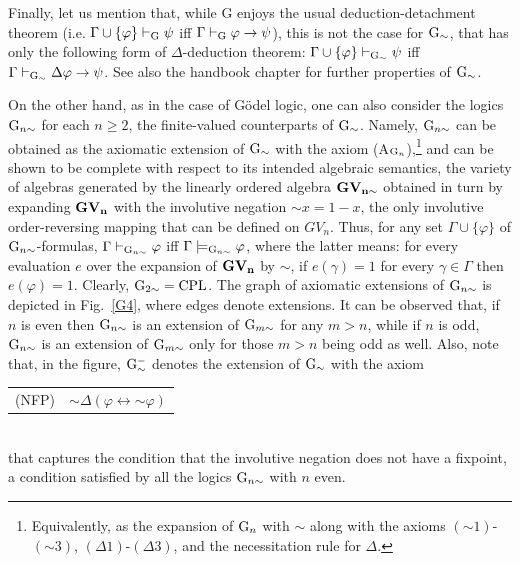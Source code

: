 \documentclass{article}
\theoremstyle{definition}
\newcommand{\ninv}{\mathord{\sim}}
\begin{document}
Finally,  let us mention that, while G enjoys the usual deduction-detachment theorem (i.e. $\Gamma \cup\{\varphi\} \vdash_{{\rm G}} \psi$ iff $\Gamma \vdash_{{\rm G}} \varphi \to \psi$),
this is not the case for ${\rm G}_{\ninv}$, that has only the following form of $\Delta$-deduction theorem:
$\Gamma \cup\{\varphi\} \vdash_{{\rm G}_{\ninv}} \psi$ iff $\Gamma \vdash_{{\rm G}_{\ninv}} \Delta\varphi \to \psi$. See also the handbook chapter \cite{EsGoMa} for further properties of ${\rm G}_{\ninv}$. 


On the other hand, as in the case of G\"odel logic, one can also consider the logics ${\rm G}_{n\sim}$ for each $n \geq 2$, the finite-valued counterparts of ${\rm G}_\sim$. Namely, ${\rm G}_{n\sim}$ can be obtained as the axiomatic extension of ${\rm G}_\sim$ with the axiom  (A$_{{\rm G}_n}$),\footnote{Equivalently, as the expansion of ${\rm G}_n$ with $\sim$ along with the axioms $(\ninv 1)$-$(\ninv 3)$, $(\Delta 1)$-$(\Delta 3)$, and the necessitation rule for $\Delta$.} and can be shown to be complete  with respect to its intended algebraic semantics, the variety of algebras generated by the linearly ordered algebra  $\bf GV_{n\sim}$ obtained in turn by expanding $\bf GV_n$ with the involutive negation ${\sim} x = 1-x$, the only involutive order-reversing mapping that can be defined on $GV_n$. Thus, for any set $\Gamma \cup \{\varphi\}$ of ${\rm G}_{n\sim}$-formulas, $\Gamma \vdash_{{\rm G}_{n\sim}} \varphi$ iff $\Gamma \models_{{\rm G}_{n\sim}} \varphi$, where the latter means: for every evaluation $e$ over the expansion of $\bf GV_n$ by ${\sim}$, if $e(\gamma) =1$ for every $\gamma \in \Gamma$  then $e(\varphi)=1$. Clearly, ${\rm G}_{2\sim} = {\rm CPL}$. The graph of axiomatic extensions of ${\rm G}_{n\sim}$ is depicted in Fig.~\ref{G4}, where edges denote extensions. It can be observed that, if $n$ is even  then ${\rm G}_{n\sim}$ is an extension of ${\rm G}_{m\sim}$ for any $m > n$, while if $n$ is odd, ${\rm G}_{n\sim}$ is an extension of ${\rm G}_{m\sim}$ only for those $m > n$ being odd as well.  Also, note that, in the figure, ${\rm G}^-_\sim$ denotes the extension of ${\rm G}_\sim$ with the axiom \\

\begin{tabular}{ll}
(NFP) & $\ninv\Delta(\varphi \leftrightarrow \ninv \varphi)$
\end{tabular}
 \mbox{ } \\

 \noindent that captures the condition that the involutive negation does not have a fixpoint, a condition satisfied by all the logics ${\rm G}_{n\sim}$ with $n$ even.
\end{document}
